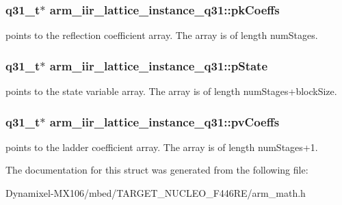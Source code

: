 \subsubsection[{\texorpdfstring{pk\+Coeffs}{pkCoeffs}}]{\setlength{\rightskip}{0pt plus 5cm}q31\+\_\+t$\ast$ arm\+\_\+iir\+\_\+lattice\+\_\+instance\+\_\+q31\+::pk\+Coeffs}\hypertarget{structarm__iir__lattice__instance__q31_a1d30aa16aac7722936ea9dee59211863}{}\label{structarm__iir__lattice__instance__q31_a1d30aa16aac7722936ea9dee59211863}
points to the reflection coefficient array. The array is of length num\+Stages. 
\subsubsection[{\texorpdfstring{p\+State}{pState}}]{\setlength{\rightskip}{0pt plus 5cm}q31\+\_\+t$\ast$ arm\+\_\+iir\+\_\+lattice\+\_\+instance\+\_\+q31\+::p\+State}\hypertarget{structarm__iir__lattice__instance__q31_a941282745effd26a889fbfadf4b95e6a}{}\label{structarm__iir__lattice__instance__q31_a941282745effd26a889fbfadf4b95e6a}
points to the state variable array. The array is of length num\+Stages+block\+Size. 
\subsubsection[{\texorpdfstring{pv\+Coeffs}{pvCoeffs}}]{\setlength{\rightskip}{0pt plus 5cm}q31\+\_\+t$\ast$ arm\+\_\+iir\+\_\+lattice\+\_\+instance\+\_\+q31\+::pv\+Coeffs}\hypertarget{structarm__iir__lattice__instance__q31_a04507e2b982b1dfa97b7b55752dea6b9}{}\label{structarm__iir__lattice__instance__q31_a04507e2b982b1dfa97b7b55752dea6b9}
points to the ladder coefficient array. The array is of length num\+Stages+1. 

The documentation for this struct was generated from the following file\+:\begin{DoxyCompactItemize}
\item 
Dynamixel-\/\+M\+X106/mbed/\+T\+A\+R\+G\+E\+T\+\_\+\+N\+U\+C\+L\+E\+O\+\_\+\+F446\+R\+E/arm\+\_\+math.\+h\end{DoxyCompactItemize}
